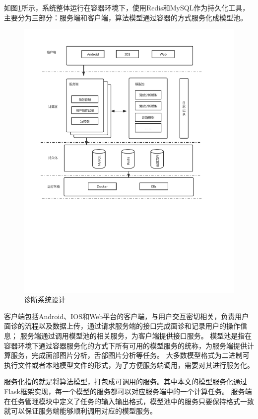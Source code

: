 如图\ref{fig:system}所示，系统整体运行在容器环境下，使用Redis和MySQL作为持久化工具，主要分为三部分：服务端和客户端，算法模型通过容器的方式服务化成模型池。
\begin{figure}
    \centering
    \includegraphics[width=15cm]{images/system2.pdf}
    \caption{诊断系统设计}
    \label{fig:system}
\end{figure}

客户端包括Android、IOS和Web平台的客户端，与用户交互密切相关，负责用户面诊的流程以及数据上传，通过请求服务端的接口完成面诊和记录用户的操作信息；
服务端通过调用模型池的相关服务，为客户端提供接口服务。
模型池是指在容器环境下通过容器服务化的方式下所有可用的模型服务的统称，为服务端提供计算服务，完成面部图片分析，舌部图片分析等任务。
大多数模型格式为二进制可执行文件或者本地模型文件的形式，为了方便服务端调用，需要对其进行服务化。

服务化指的就是将算法模型，打包成可调用的服务。其中本文的模型服务化通过Flask框架实现，每一个模型的服务都可以对应服务端中的一个计算任务。
服务端在任务管理模块中定义了任务的输入输出格式，模型池中的服务只要保持格式一致就可以保证服务端能够顺利调用对应的模型服务。


